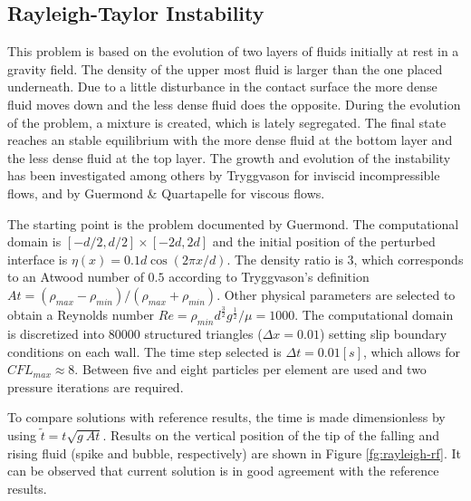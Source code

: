 \subsection{Rayleigh-Taylor Instability}\label{sec:rt}

This problem is based on the evolution of two layers of fluids initially at rest in a gravity field. The density of the upper most fluid is larger than the one placed underneath. Due to a little disturbance in the contact surface the more dense fluid moves down and the less dense fluid does the opposite. During the evolution of the problem, a mixture is created, which is lately segregated. The final state reaches an stable equilibrium with the more dense fluid at the bottom layer and the less dense fluid at the top layer. The growth and evolution of the instability has been investigated among others by Tryggvason\cite{Tryggvason88} for inviscid incompressible flows, and by Guermond \& Quartapelle\cite{Guermond00} for viscous flows.

The starting point is the problem documented by Guermond\cite{Guermond00}. The computational domain is $[-d/2,d/2]\times[-2d,2d]$ and the initial position of the perturbed interface is $\eta(x) = 0.1d \cos(2\pi x/d)$. The density ratio is $3$, which corresponds to an Atwood
number of $0.5$ according to Tryggvason's definition $At = (\rho_{max}-\rho_{min})/(\rho_{max}+\rho_{min})$. Other physical parameters are selected to obtain a Reynolds number $Re=\rho_{min}d^{\frac{3}{2}}g^{\frac{1}{2}}/\mu=1000$. The computational domain is discretized into $80000$ structured triangles ($\Delta x=0.01$) setting slip boundary conditions on each wall. The time step selected is $\Delta t=0.01[s]$, which allows for $CFL_{max} \approx 8$. Between five and eight particles per element are used and two pressure iterations are required.

To compare solutions with reference results, the time is made dimensionless by using $\widetilde{t} = t\sqrt{g\ At}$. Results on the vertical position of the tip of the falling and rising fluid (spike and bubble, respectively) are shown in Figure \ref{fg:rayleigh-rf}. It can be observed that current solution is in good agreement with the reference results.

